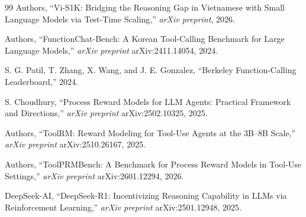 \documentclass[11pt,a4paper]{article}
\begin{document}
\begin{thebibliography}{99}
Authors, ``Vi-S1K: Bridging the Reasoning Gap in Vietnamese with Small Language Models via Test-Time Scaling,'' \textit{arXiv preprint}, 2026.

Authors, ``FunctionChat-Bench: A Korean Tool-Calling Benchmark for Large Language Models,'' \textit{arXiv preprint} arXiv:2411.14054, 2024.

S. G. Patil, T. Zhang, X. Wang, and J. E. Gonzalez, ``Berkeley Function-Calling Leaderboard,'' 2024.

S. Choudhury, ``Process Reward Models for LLM Agents: Practical Framework and Directions,'' \textit{arXiv preprint} arXiv:2502.10325, 2025.

Authors, ``ToolRM: Reward Modeling for Tool-Use Agents at the 3B--8B Scale,'' \textit{arXiv preprint} arXiv:2510.26167, 2025.

Authors, ``ToolPRMBench: A Benchmark for Process Reward Models in Tool-Use Settings,'' \textit{arXiv preprint} arXiv:2601.12294, 2026.

DeepSeek-AI, ``DeepSeek-R1: Incentivizing Reasoning Capability in LLMs via Reinforcement Learning,'' \textit{arXiv preprint} arXiv:2501.12948, 2025.

\end{thebibliography}
\end{document}
